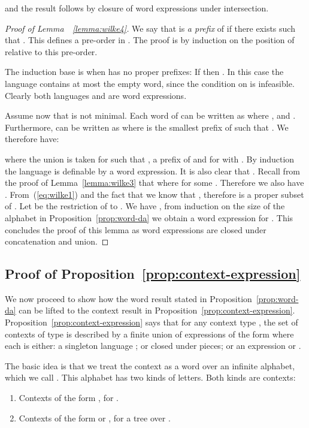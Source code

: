 \documentclass{LMCS}
\begin{document}
and the result follows by closure of  word expressions under
intersection.


\medskip
\begin{proof}[Proof of Lemma~~\ref{lemma:wilke4}]
  We say that  is \emph{a prefix} of  if there exists 
  such that . This defines a pre-order in . The proof is by
  induction on the position of  relative to this pre-order.

  The induction base is when  has no proper prefixes: If  then .
  In this case the language  contains at most the empty word, since the
  condition on  is infeasible.  Clearly both languages
   and  are  word expressions.

Assume now that  is not minimal. Each word  of  can be written as
 where ,  and . Furthermore,  can be
written as  where  is the smallest prefix of  such that
. We therefore have:

where the union is taken for  such that ,
 a prefix of  and for  with . By induction the language  is definable by a
 word expression. It is also clear that . Recall from the proof of Lemma~\ref{lemma:wilke3} that
 where  for some .
Therefore we also have .
From~(\ref{eq:wilke1}) and the fact that  we know that , therefore  is a proper subset of . Let 
be the restriction of  to . We have
, from induction on the size of
the alphabet in Proposition~\ref{prop:word-da} we obtain a 
word expression for . This concludes the proof of this lemma
as  word expressions are closed under concatenation and union.
\end{proof}




\subsection{Proof of Proposition~\ref{prop:context-expression}}
\label{sec:proof-prop-refpr}
We now proceed to show how the word result stated in
Proposition~\ref{prop:word-da} can be lifted to the context result in
Proposition~\ref{prop:context-expression}. Proposition~\ref{prop:context-expression}
says that for any context type , the set of contexts of type 
  is described by a finite union of expressions of the form  where each  is either: a singleton language ; or
closed under pieces; or an expression  or .

The basic idea is that we treat the context as a word over an infinite
alphabet, which we call . This alphabet has two kinds of letters.
Both kinds are contexts:
\begin{enumerate}[]
\item Contexts of the form , for .
\item Contexts of the form  or , for  a tree
  over .
\end{enumerate}
\end{document}
